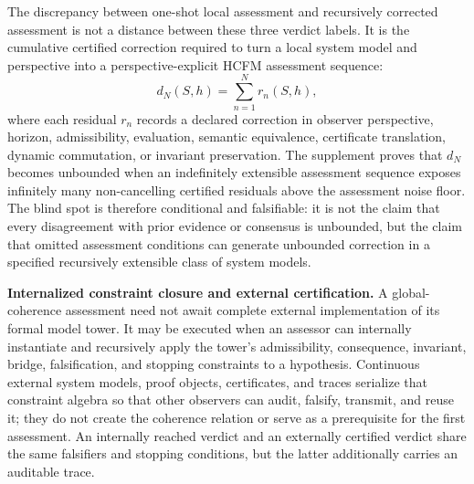 \documentclass[11pt]{article}
\theoremstyle{definition}
\begin{document}
The discrepancy between one-shot local assessment and recursively corrected assessment is not a distance between these three verdict labels. It is the cumulative certified correction required to turn a local system model and perspective into a perspective-explicit HCFM assessment sequence:
\[
d_N(S, h) = \sum_{n=1}^{N} r_n(S, h),
\]
where each residual $r_n$ records a declared correction in observer perspective, horizon, admissibility, evaluation, semantic equivalence, certificate translation, dynamic commutation, or invariant preservation. The supplement proves that $d_N$ becomes unbounded when an indefinitely extensible assessment sequence exposes infinitely many non-cancelling certified residuals above the assessment noise floor. The blind spot is therefore conditional and falsifiable: it is not the claim that every disagreement with prior evidence or consensus is unbounded, but the claim that omitted assessment conditions can generate unbounded correction in a specified recursively extensible class of system models.

\noindent\textbf{Internalized constraint closure and external certification.} A global-coherence assessment need not await complete external implementation of its formal model tower. It may be executed when an assessor can internally instantiate and recursively apply the tower's admissibility, consequence, invariant, bridge, falsification, and stopping constraints to a hypothesis. Continuous external system models, proof objects, certificates, and traces serialize that constraint algebra so that other observers can audit, falsify, transmit, and reuse it; they do not create the coherence relation or serve as a prerequisite for the first assessment. An internally reached verdict and an externally certified verdict share the same falsifiers and stopping conditions, but the latter additionally carries an auditable trace.
\end{document}
